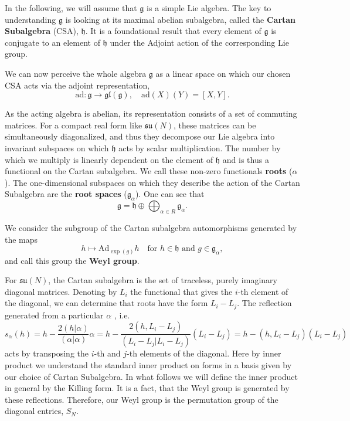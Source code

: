 \documentclass[11pt, a4paper]{article}
\newcommand{\su}{\mathfrak{su}}
\theoremstyle{definition}
\theoremstyle{remark}
\begin{document}
In the following, we will assume that $\mathfrak{g}$ is a simple Lie algebra. The key to understanding $\mathfrak{g}$ is looking at its maximal abelian subalgebra, called the \textbf{Cartan Subalgebra} (CSA), $\mathfrak{h}$. It is a foundational result that every element of $\mathfrak{g}$ is conjugate to an element of $\mathfrak{h}$ under the Adjoint action of the corresponding Lie group.

We can now perceive the whole algebra $\mathfrak{g}$ as a linear space on which our chosen CSA acts via the adjoint representation,
\begin{equation}
    \mathrm{ad}: \mathfrak{g} \to \mathfrak{gl}(\mathfrak{g}), \quad \mathrm{ad}(X)(Y) = [X,Y].
\end{equation}


As the acting algebra is abelian, its representation consists of a set of commuting matrices. For a compact real form like $\su(N)$, these matrices can be simultaneously diagonalized, and thus they decompose our Lie algebra into invariant subspaces on which $\mathfrak{h}$ acts by scalar multiplication. The number by which we multiply is linearly dependent on the element of $\mathfrak{h}$ and is thus a functional on the Cartan subalgebra. We call these non-zero functionals \textbf{roots} ($\alpha$). The one-dimensional subspaces on which they describe the action of the Cartan Subalgebra are the \textbf{root spaces} ($\mathfrak{g}_\alpha$). One can see that
\begin{equation}
    \mathfrak{g} = \mathfrak{h} \oplus \bigoplus_{\alpha \in R} \mathfrak{g}_\alpha.\end{equation}

We consider the subgroup of the Cartan subalgebra automorphisms generated by the maps
\[
h \mapsto \mathrm{Ad}_{\exp(g)} h \quad \text{for } h \in \mathfrak{h} \text{ and } g \in \mathfrak{g}_\alpha,
\]
and call this group the \textbf{Weyl group}.

For $\su(N)$, the Cartan subalgebra is the set of traceless, purely imaginary diagonal matrices. Denoting by $L_i$ the functional that gives the $i$-th element of the diagonal, we can determine that roots have the form $L_i-L_j$. The reflection generated from a particular $\alpha$ , i.e.
\begin{equation}
s_{\alpha}(h) = h - \frac{2(h|\alpha)}{(\alpha|\alpha)}\alpha = h - \frac{2(h,L_i-L_j)}{(L_i-L_j|L_i-L_j)}(L_i-L_j) = h - (h,L_i-L_j)(L_i-L_j)
\end{equation}
acts by transposing the $i$-th and $j$-th elements of the diagonal. Here by inner product we understand the standard inner product on forms in a basis given by our choice of Cartan Subalgebra. In what follows we will define the inner product in general by the Killing form. It is a fact, that the Weyl group is generated by these reflections. Therefore, our Weyl group is the permutation      group of the diagonal entries, $S_N$.
\end{document}
